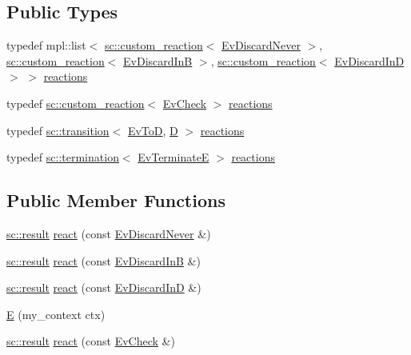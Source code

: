 \subsection*{Public Types}
\begin{DoxyCompactItemize}
\item 
typedef mpl\+::list$<$ \mbox{\hyperlink{classboost_1_1statechart_1_1custom__reaction}{sc\+::custom\+\_\+reaction}}$<$ \mbox{\hyperlink{struct_ev_discard_never}{Ev\+Discard\+Never}} $>$, \mbox{\hyperlink{classboost_1_1statechart_1_1custom__reaction}{sc\+::custom\+\_\+reaction}}$<$ \mbox{\hyperlink{struct_ev_discard_in_b}{Ev\+Discard\+InB}} $>$, \mbox{\hyperlink{classboost_1_1statechart_1_1custom__reaction}{sc\+::custom\+\_\+reaction}}$<$ \mbox{\hyperlink{struct_ev_discard_in_d}{Ev\+Discard\+InD}} $>$ $>$ \mbox{\hyperlink{struct_e_a74945ed9425f80f1034e2ae1100d53ac}{reactions}}
\item 
typedef \mbox{\hyperlink{classboost_1_1statechart_1_1custom__reaction}{sc\+::custom\+\_\+reaction}}$<$ \mbox{\hyperlink{struct_ev_check}{Ev\+Check}} $>$ \mbox{\hyperlink{struct_e_ad06410f6762dda5542a645bf3529ebe6}{reactions}}
\item 
typedef \mbox{\hyperlink{classboost_1_1statechart_1_1transition}{sc\+::transition}}$<$ \mbox{\hyperlink{struct_ev_to_d}{Ev\+ToD}}, \mbox{\hyperlink{struct_d}{D}} $>$ \mbox{\hyperlink{struct_e_ae439ec4811591cc609b7efbdf33a883d}{reactions}}
\item 
typedef \mbox{\hyperlink{classboost_1_1statechart_1_1termination}{sc\+::termination}}$<$ \mbox{\hyperlink{struct_ev_terminate_e}{Ev\+TerminateE}} $>$ \mbox{\hyperlink{struct_e_a6d3e91ddd0ac1560ad967313940ef464}{reactions}}
\end{DoxyCompactItemize}
\subsection*{Public Member Functions}
\begin{DoxyCompactItemize}
\item 
\mbox{\hyperlink{namespaceboost_1_1statechart_abe807f6598b614d6d87bb951ecd92331}{sc\+::result}} \mbox{\hyperlink{struct_e_ad7041b738a0be26a38c6467bafb53887}{react}} (const \mbox{\hyperlink{struct_ev_discard_never}{Ev\+Discard\+Never}} \&)
\item 
\mbox{\hyperlink{namespaceboost_1_1statechart_abe807f6598b614d6d87bb951ecd92331}{sc\+::result}} \mbox{\hyperlink{struct_e_ae2ee0692466ac592be4c04630cdc69ec}{react}} (const \mbox{\hyperlink{struct_ev_discard_in_b}{Ev\+Discard\+InB}} \&)
\item 
\mbox{\hyperlink{namespaceboost_1_1statechart_abe807f6598b614d6d87bb951ecd92331}{sc\+::result}} \mbox{\hyperlink{struct_e_a12a9677bb416edbfde60653d5d587430}{react}} (const \mbox{\hyperlink{struct_ev_discard_in_d}{Ev\+Discard\+InD}} \&)
\item 
\mbox{\hyperlink{struct_e_a0fc5614316a5cebd4a4a206af9cd1bde}{E}} (my\+\_\+context ctx)
\item 
\mbox{\hyperlink{namespaceboost_1_1statechart_abe807f6598b614d6d87bb951ecd92331}{sc\+::result}} \mbox{\hyperlink{struct_e_af9708ace52c4c8a25da2ae876755854a}{react}} (const \mbox{\hyperlink{struct_ev_check}{Ev\+Check}} \&)
\end{DoxyCompactItemize}
